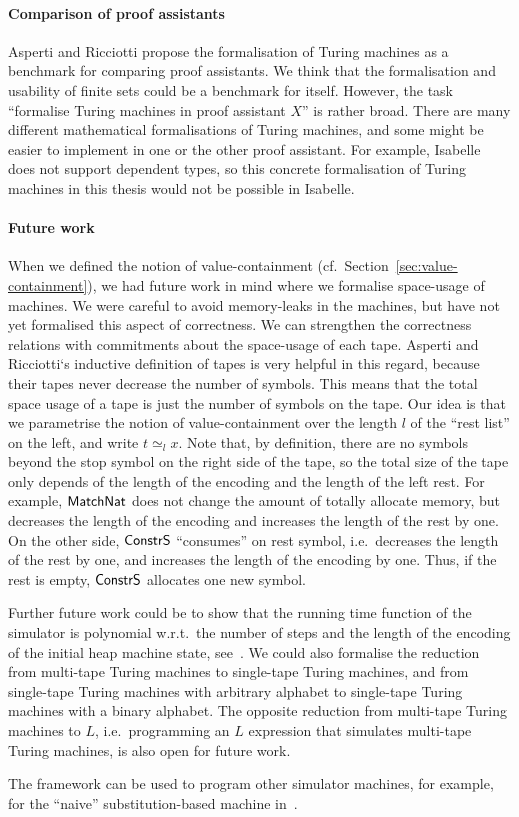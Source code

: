 \paragraph{Comparison of proof assistants}
Asperti and Ricciotti\cite{asperti2015} propose the formalisation of Turing machines as a benchmark for comparing proof assistants.  We think that the
formalisation and usability of finite sets could be a benchmark for itself.  However, the task ``formalise Turing machines in proof assistant $X$'' is
rather broad.  There are many different mathematical formalisations of Turing machines, and some might be easier to implement in one or the other
proof assistant.  For example, Isabelle does not support dependent types, so this concrete formalisation of Turing machines in this thesis would not
be possible in Isabelle.



\paragraph{Future work}
When we defined the notion of value-containment (cf.~Section~\ref{sec:value-containment}), we had future work in mind where we formalise space-usage
of machines.  We were careful to avoid memory-leaks in the machines, but have not yet formalised this aspect of correctness.  We can strengthen the
correctness relations with commitments about the space-usage of each tape.  Asperti and Ricciotti`s inductive definition of tapes is very helpful in
this regard, because their tapes never decrease the number of symbols.  This means that the total space usage of a tape is just the number of symbols
on the tape.  Our idea is that we parametrise the notion of value-containment over the length $l$ of the ``rest list'' on the left, and write
$t \simeq_{l} x$.  Note that, by definition, there are no symbols beyond the stop symbol on the right side of the tape, so the total size of the tape
only depends of the length of the encoding and the length of the left rest.  For example, $\mathsf{MatchNat}$ does not change the amount of totally
allocate memory, but decreases the length of the encoding and increases the length of the rest by one.  On the other side, $\mathsf{ConstrS}$ ``consumes''
on rest symbol, i.e.\ decreases the length of the rest by one, and increases the length of the encoding by one.  Thus, if the rest is empty,
$\mathsf{ConstrS}$ allocates one new symbol.

Further future work could be to show that the running time function of the simulator is polynomial w.r.t.\ the number of steps and the length of the
encoding of the initial heap machine state, see~\cite{ForsterLOLA2017}.  We could also formalise the reduction from multi-tape Turing machines to
single-tape Turing machines, and from single-tape Turing machines with arbitrary alphabet to single-tape Turing machines with a binary alphabet.  The
opposite reduction from multi-tape Turing machines to $L$, i.e.\ programming an $L$ expression that simulates multi-tape Turing machines, is also open
for future work.

The framework can be used to program other simulator machines, for example, for the ``naive'' substitution-based machine
in~\cite{KunzeEtAl:2018:Formal}.


